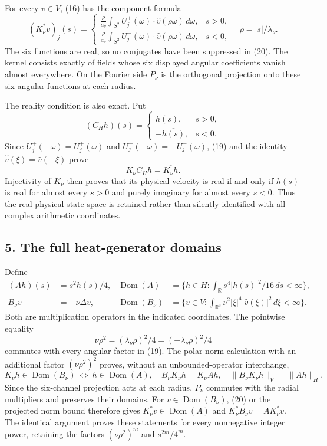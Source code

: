 For every \(v\in V\), (16) has the component formula \[
(K_\nu^*v)_j(s)=
\begin{cases}
\displaystyle\frac\rho{a_\nu}\int_{S^2}U_j^+(\omega)\cdot\widehat v(\rho\omega)\,d\omega,&s>0,\\
\displaystyle\frac\rho{a_\nu}\int_{S^2}U_j^-(\omega)\cdot\widehat v(\rho\omega)\,d\omega,&s<0,
\end{cases}
\quad \rho=|s|/\lambda_\nu.
\tag{20}
\] The six functions are real, so no conjugates have been suppressed in (20). The kernel consists exactly of fields whose six displayed angular coefficients vanish almost everywhere. On the Fourier side \(P_\nu\) is the orthogonal projection onto these six angular functions at each radius.

The reality condition is also exact. Put \[
(C_Hh)(s)=\begin{cases}\overline{h(s)},&s>0,\\-\overline{h(s)},&s<0.\end{cases}
\tag{21}
\] Since \(U_j^+(-\omega)=U_j^+(\omega)\) and \(U_j^-(-\omega)=-U_j^-(\omega)\), (19) and the identity \(\widehat{\overline v}(\xi)=\overline{\widehat v(-\xi)}\) prove \[
K_\nu C_Hh=\overline{K_\nu h}.
\tag{22}
\] Injectivity of \(K_\nu\) then proves that its physical velocity is real if and only if \(h(s)\) is real for almost every \(s>0\) and purely imaginary for almost every \(s<0\). Thus the real physical state space is retained rather than silently identified with all complex arithmetic coordinates.

\subsection*{5. The full heat-generator domains}

Define \[
\begin{aligned}
(Ah)(s)&=s^2h(s)/4,&
\operatorname{Dom}(A)&=\{h\in H:\int_{\mathbb R}s^4|h(s)|^2/16\,ds<\infty\},\\
B_\nu v&=-\nu\Delta v,&
\operatorname{Dom}(B_\nu)&=\{v\in V:\int_{\mathbb R^3}\nu^2|\xi|^4|\widehat v(\xi)|^2\,d\xi<\infty\}.
\end{aligned}
\tag{23}
\] Both are multiplication operators in the indicated coordinates. The pointwise equality \[
\nu\rho^2=(\lambda_\nu\rho)^2/4=(-\lambda_\nu\rho)^2/4
\tag{24}
\] commutes with every angular factor in (19). The polar norm calculation with an additional factor \((\nu\rho^2)^2\) proves, without an unbounded-operator interchange, \[
K_\nu h\in\operatorname{Dom}(B_\nu)\ \Longleftrightarrow\ h\in\operatorname{Dom}(A),
\quad B_\nu K_\nu h=K_\nu Ah,
\quad\|B_\nu K_\nu h\|_V=\|Ah\|_H.
\tag{25}
\] Since the six-channel projection acts at each radius, \(P_\nu\) commutes with the radial multipliers and preserves their domains. For \(v\in\operatorname{Dom}(B_\nu)\), (20) or the projected norm bound therefore gives \(K_\nu^*v\in\operatorname{Dom}(A)\) and \(K_\nu^*B_\nu v=AK_\nu^*v\). The identical argument proves these statements for every nonnegative integer power, retaining the factors \((\nu\rho^2)^m\) and \(s^{2m}/4^m\).

